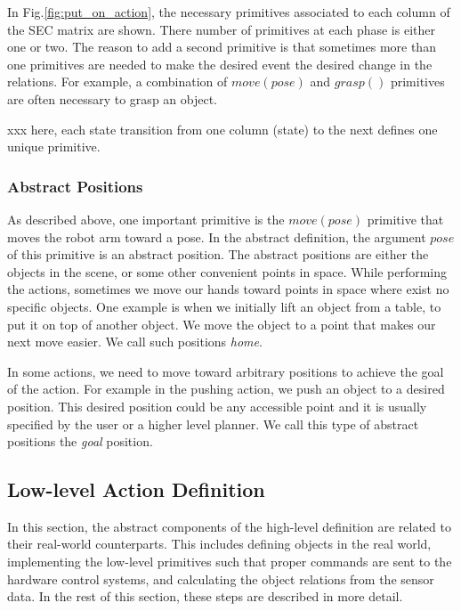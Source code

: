 In Fig.\ref{fig:put_on_action}, the necessary primitives associated to each column of the SEC matrix are shown.
There number of primitives at each phase is either one or two.
The reason to add a second primitive is that sometimes more than one primitives are needed to make the desired event \ie the desired change in the relations.
For example, a combination of $move(pose)$ and $grasp()$ primitives are often necessary to grasp an object.

xxx here, each state transition from one column (state) to the next defines one unique primitive.


\subsubsection{Abstract Positions}

As described above, one important primitive is the $move(pose)$ primitive that moves the robot arm toward a pose.
In the abstract definition, the argument $pose$ of this primitive is an abstract position.
The abstract positions are either the objects in the scene, or some other convenient points in space.
While performing the actions, sometimes we move our hands toward points in space where exist no specific objects.
One example is when we initially lift an object from a table, to put it on top of another object.
We move the object to a point that makes our next move easier.
We call such positions \textit{home}.

In some actions, we need to move toward arbitrary positions to achieve the goal of the action.
For example in the pushing action, we push an object to a desired position.
This desired position could be any accessible point and it is usually specified by the user or a higher level planner.
We call this type of abstract positions the \textit{goal} position.



\subsection{Low-level Action Definition}
\label{sec:low-level}
In this section, the abstract components of the high-level definition are related to their real-world counterparts.
This includes defining objects in the real world, implementing the low-level primitives such that proper commands are sent to the hardware control systems,
and calculating the object relations from the sensor data.
In the rest of this section, these steps are described in more detail.


